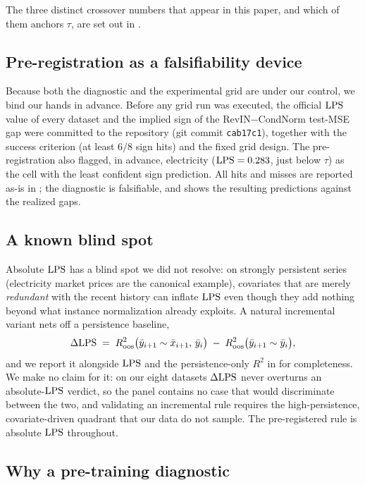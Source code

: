 The three distinct crossover numbers that appear in this paper, and which of them anchors $\tau$, are set out in .


\subsection{Pre-registration as a falsifiability device}

Because both the diagnostic and the experimental grid are under our control, we bind our hands in advance. Before any grid run was executed, the official $\mathrm{LPS}$ value of every dataset and the implied sign of the RevIN$-$CondNorm test-MSE gap were committed to the repository (git commit \texttt{cab17c1}), together with the success criterion (at least $6/8$ sign hits) and the fixed grid design. The pre-registration also flagged, in advance, electricity ($\mathrm{LPS} = 0.283$, just below $\tau$) as the cell with the least confident sign prediction. All hits and misses are reported as-is in ; the diagnostic is falsifiable, and  shows the resulting predictions against the realized gaps.

\subsection{A known blind spot}

Absolute $\mathrm{LPS}$ has a blind spot we did not resolve: on strongly persistent series (electricity market prices are the canonical example), covariates that are merely \emph{redundant} with the recent history can inflate $\mathrm{LPS}$ even though they add nothing beyond what instance normalization already exploits. A natural incremental variant nets off a persistence baseline,
\begin{equation}\label{eq:dlps}
\Delta\mathrm{LPS} \;=\; R^2_{\mathrm{oos}}\bigl(\bar{y}_{i+1} \sim \bar{x}_{i+1},\, \bar{y}_i\bigr) \;-\; R^2_{\mathrm{oos}}\bigl(\bar{y}_{i+1} \sim \bar{y}_i\bigr),
\end{equation}
and we report it alongside $\mathrm{LPS}$ and the persistence-only $R^2$ in  for completeness. We make no claim for it: on our eight datasets $\Delta\mathrm{LPS}$ never overturns an absolute-$\mathrm{LPS}$ verdict, so the panel contains no case that would discriminate between the two, and validating an incremental rule requires the high-persistence, covariate-driven quadrant that our data do not sample. The pre-registered rule is absolute $\mathrm{LPS}$ throughout.

\subsection{Why a pre-training diagnostic}

